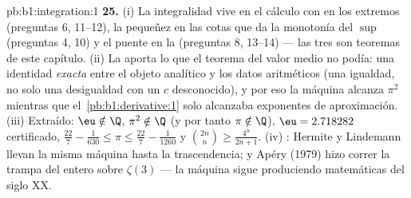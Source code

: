 \begin{solution}{pb:b1:integration:1}
\textbf{25.} (i) La integralidad vive en el cálculo con
 en los extremos (preguntas 6, 11--12), la pequeñez en
las cotas que da la monotonía del $\sup$ (preguntas 4, 10) y el
puente en la  (preguntas 8, 13--14) --- las
tres son teoremas de este capítulo. (ii) La  aporta lo que el
teorema del valor medio no podía: una identidad \emph{exacta} entre
el objeto analítico y los datos aritméticos (una igualdad, no solo
una desigualdad con un $c$ desconocido), y por eso la máquina alcanza
$\pi^2$ mientras que el~\cref{pb:b1:derivative:1} solo alcanzaba
exponentes de aproximación. (iii) Extraído: $\eu \notin \Q$,
$\pi^2 \notin \Q$ (y por tanto $\pi \notin \Q$), $\eu = 2.718282$
certificado,
$\frac{22}{7} - \frac{1}{630} \leq \pi \leq \frac{22}{7} -
\frac{1}{1260}$ y $\binom{2n}{n} \geq \frac{4^n}{2n+1}$.
(iv) : Hermite y Lindemann llevan la misma máquina hasta la
trascendencia; y Apéry (1979) hizo correr la trampa del entero sobre
$\zeta(3)$ --- la máquina sigue produciendo matemáticas del siglo XX.
\end{solution}
